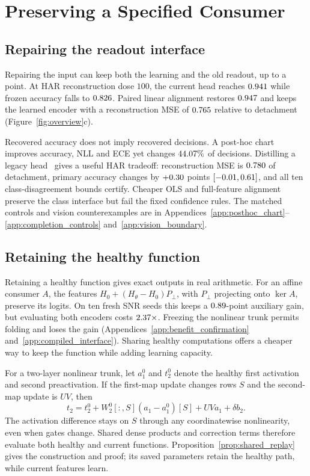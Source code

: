 \documentclass{article}
\begin{document}
\section{Preserving a Specified Consumer}\label{sec:stf}\label{sec:stfcal}

\subsection{Repairing the readout interface}

Repairing the input can keep both the learning and the old readout, up to a
point. At HAR reconstruction dose $100$, the current head reaches
$0.941$ while frozen accuracy falls to $0.826$.
Paired linear alignment restores $0.947$ and keeps the
learned encoder with a reconstruction MSE of $0.765$ relative
to detachment (Figure~\ref{fig:overview}c).

Recovered accuracy does not imply recovered decisions. A post-hoc chart
improves accuracy, NLL and ECE yet changes $44.07\%$ of
decisions. Distilling a legacy head~\citep{hinton2015distilling,li2016lwf}
gives a useful HAR tradeoff: reconstruction MSE is $0.780$ of
detachment, primary accuracy changes by $+0.30$ points
$[-0.01,0.61]$, and all ten class-disagreement bounds
certify. Cheaper OLS and full-feature alignment preserve the class interface
but fail the fixed confidence rules. The matched controls and vision
counterexamples are in Appendices~\ref{app:posthoc_chart}--\ref{app:completion_controls}
and~\ref{app:vision_boundary}.

\subsection{Retaining the healthy function}

Retaining a healthy function gives exact outputs in real arithmetic.
For an affine consumer $A$, the features
$H_0+(H_\theta-H_0)P_\perp$, with $P_\perp$ projecting onto $\ker A$,
preserve its logits. On ten fresh SNR seeds this keeps a
$0.89$-point auxiliary gain, but evaluating both encoders costs
$2.37\times$. Freezing the nonlinear trunk permits folding
and loses the gain (Appendices~\ref{app:benefit_confirmation}
and~\ref{app:compiled_interface}). Sharing healthy computations offers a
cheaper way to keep the function while adding learning capacity.

For a two-layer nonlinear trunk, let $a_1^0$ and $t_2^0$ denote the
healthy first activation and second preactivation. If the first-map update
changes rows $S$ and the second-map update is $UV$, then
\begin{equation}
t_2=t_2^0+W_2^0[:,S](a_1-a_1^0)[S]+UVa_1+\delta b_2.
\label{eq:shared_replay}
\end{equation}
The activation difference stays on $S$ through any coordinatewise
nonlinearity, even when gates change. Shared dense products and correction
terms therefore evaluate both healthy and current functions.
Proposition~\ref{prop:shared_replay} gives the construction and proof;
its saved parameters retain the healthy path, while current features learn.
\end{document}

